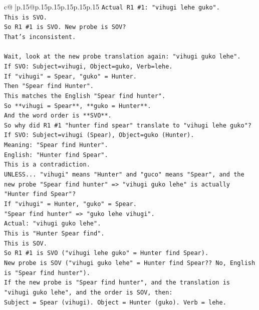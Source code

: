 \documentclass{article}
\begin{document}
{\begin{supertabular}{c@{$\;$}|p{.15\linewidth}@{}p{.15\linewidth}p{.15\linewidth}p{.15\linewidth}p{.15\linewidth}p{.15\linewidth}}
{{{\texttt{Actual R1 \#1: "vihugi lehe guko".} \\
\texttt{This is SVO.} \\
\texttt{So R1 \#1 is SVO. New probe is SOV?} \\
\texttt{That's inconsistent.} \\
\\ 
\texttt{Wait, look at the new probe translation again: "vihugi guko lehe".} \\
\texttt{If SVO: Subject=vihugi, Object=guko, Verb=lehe.} \\
\texttt{If "vihugi" = Spear, "guko" = Hunter.} \\
\texttt{Then "Spear find Hunter".} \\
\texttt{This matches the English "Spear find hunter".} \\
\texttt{So **vihugi = Spear**, **guko = Hunter**.} \\
\texttt{And the word order is **SVO**.} \\
\texttt{So why did R1 \#1 "hunter find spear" translate to "vihugi lehe guko"?} \\
\texttt{If SVO: Subject=vihugi (Spear), Object=guko (Hunter).} \\
\texttt{Meaning: "Spear find Hunter".} \\
\texttt{English: "Hunter find Spear".} \\
\texttt{This is a contradiction.} \\
\texttt{UNLESS... "vihugi" means "Hunter" and "guco" means "Spear", and the new probe "Spear find hunter" => "vihugi guko lehe" is actually "Hunter find Spear"?} \\
\texttt{If "vihugi" = Hunter, "guko" = Spear.} \\
\texttt{"Spear find hunter" => "guko lehe vihugi".} \\
\texttt{Actual: "vihugi guko lehe".} \\
\texttt{This is "Hunter Spear find".} \\
\texttt{This is SOV.} \\
\texttt{So R1 \#1 is SVO ("vihugi lehe guko" = Hunter find Spear).} \\
\texttt{New probe is SOV ("vihugi guko lehe" = Hunter find Spear?? No, English is "Spear find hunter").} \\
\texttt{If the new probe is "Spear find hunter", and the translation is "vihugi guko lehe", and the order is SOV, then:} \\
\texttt{Subject = Spear (vihugi). Object = Hunter (guko). Verb = lehe.} \\
}}}
\end{supertabular}}
\end{document}
